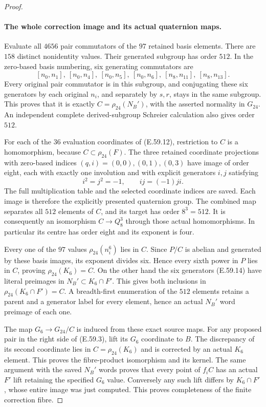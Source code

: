 \begin{proof}
\paragraph{The whole correction image and its actual quaternion maps.}
Evaluate all $4656$ pair commutators of the $97$ retained basis
elements. There are $158$ distinct nonidentity values. Their generated
subgroup has order $512$. In the zero-based basis numbering, six
generating commutators are
\[
 [n_0,n_1],\ [n_0,n_4],\ [n_0,n_5],\ [n_0,n_6],\
 [n_8,n_{11}],\ [n_8,n_{13}].
 \tag{E.59.14}
\]
Every original pair commutator is in this subgroup, and conjugating
these six generators by each original $n_i$, and separately by
$s,r$, stays in the same subgroup. This proves that it is exactly
$C=\rho_{24}(N_B')$, with the asserted normality in $G_{24}$.
An independent complete derived-subgroup Schreier calculation also
gives order $512$.

For each of the $36$ evaluation coordinates of
\textup{(E.59.12)}, restriction to $C$ is a homomorphism, because
$C\subset\rho_{24}(F)$. The three retained coordinate projections
with zero-based indices $(q,i)=(0,0),(0,1),(0,3)$ have
image of order eight, each with exactly one involution and with
explicit generators $i,j$ satisfying
\[
             i^2=j^2=-1,\qquad ij=(-1)ji.
 \tag{E.59.15}
\]
The full multiplication table and the selected coordinate indices
are saved. Each image is therefore the explicitly presented
quaternion group. The combined map separates all $512$ elements
of $C$, and its target has order $8^3=512$. It is consequently
an isomorphism $C\to Q_8^3$ through those actual homomorphisms.
In particular its centre has order eight and its exponent is four.

Every one of the $97$ values $\rho_{24}(n_i^6)$ lies in $C$.
Since $P/C$ is abelian and generated by these basis images, its
exponent divides six. Hence every sixth power in $P$ lies in $C$,
proving $\rho_{24}(K_6)=C$. On the other hand the six generators
\textup{(E.59.14)} have literal preimages in $N_B'\subset K_6\cap F'$.
This gives both inclusions in
$\rho_{24}(K_6\cap F')=C$. A breadth-first enumeration of the
$512$ elements retains a parent and a generator label for every
element, hence an actual $N_B'$ word preimage of each one.

The map $G_6\to G_{24}/C$ is induced from these exact source maps.
For any proposed pair in the right side of \textup{(E.59.3)}, lift
its $G_6$ coordinate to $B$. The discrepancy of its second coordinate
lies in $C=\rho_{24}(K_6)$ and is corrected by an actual $K_6$
element. This proves the fibre-product isomorphism and its kernel.
The same argument with the saved $N_B'$ words proves that every
point of $f_iC$ has an actual $F'$ lift retaining the specified
$G_6$ value. Conversely any such lift differs by $K_6\cap F'$,
whose entire image was just computed. This proves completeness
of the finite correction fibre.


\end{proof}
